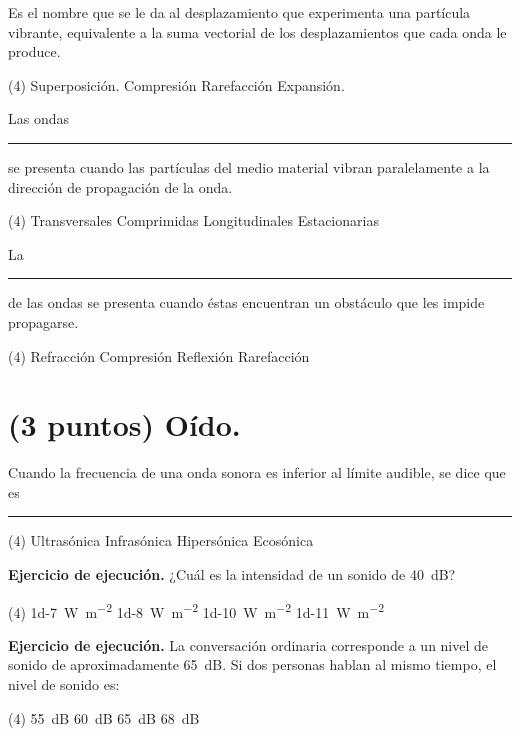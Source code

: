 \documentclass[12pt, letter]{exam}
\begin{document}
\begin{questions}
    \question Es el nombre que se le da al desplazamiento que experimenta una partícula vibrante, equivalente a la suma vectorial de los desplazamientos que cada onda le produce.
    \begin{tasks}(4)
        \task Superposición.
        \task Compresión
        \task Rarefacción
        \task Expansión.
    \end{tasks}
    \question Las ondas \rule{2cm}{0.1mm} se presenta cuando las partículas del medio material vibran paralelamente a la dirección de propagación de la onda.
    \begin{tasks}(4)
        \task Transversales
        \task Comprimidas
        \task Longitudinales
        \task Estacionarias
    \end{tasks}
    \question La \rule{2cm}{0.1mm} de las ondas se presenta cuando éstas encuentran un obstáculo que les impide propagarse.
    \begin{tasks}(4)
        \task Refracción
        \task Compresión
        \task Reflexión
        \task Rarefacción
    \end{tasks}
    
    \section{(3 puntos) Oído.}

    \question Cuando la frecuencia de una onda sonora es inferior al límite audible, se dice que es \rule{2cm}{0.1mm}
    \begin{tasks}(4)
        \task Ultrasónica
        \task Infrasónica
        \task Hipersónica
        \task Ecosónica
    \end{tasks}
    \question \label{Ejercicio_02} \textbf{Ejercicio de ejecución.} ¿Cuál es la intensidad de un sonido de \SI{40}{\dB}?
    \begin{tasks}(4)
        \task \SI{1d-7}{\watt\per\square\meter}
        \task \SI{1d-8}{\watt\per\square\meter}
        \task \SI{1d-10}{\watt\per\square\meter}
        \task \SI{1d-11}{\watt\per\square\meter}
    \end{tasks}
    \question \label{Ejercicio_03} \textbf{Ejercicio de ejecución.} La conversación ordinaria corresponde a un nivel de sonido de aproximadamente \SI{65}{\dB}. Si dos personas hablan al mismo tiempo, el nivel de sonido es:
    \begin{tasks}(4)
        \task \SI{55}{\dB}
        \task \SI{60}{\dB}
        \task \SI{65}{\dB}
        \task \SI{68}{\dB}
    \end{tasks}


\end{questions}
\end{document}
